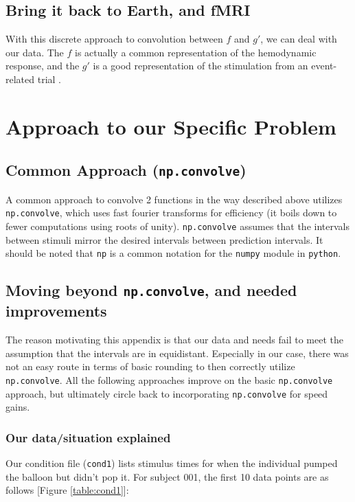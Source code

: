 \documentclass[11pt]{article}
\begin{document}
\subsection{Bring it back to Earth, and fMRI}

With this discrete approach to convolution between $f$ and $g'$, we can deal 
with our data. The $f$ is actually a common representation of the hemodynamic 
response, and the $g'$ is a good representation of the stimulation from an 
event-related trial \cite{brett2015course}. 

\section{Approach to our Specific Problem}

\subsection{Common Approach (\texttt{np.convolve})}

A common approach to convolve 2 functions in the way described above 
utilizes \texttt{np.convolve}, which uses fast fourier transforms for 
efficiency (it boils down to fewer computations using roots of unity). 
\texttt{np.convolve} assumes that the intervals between stimuli mirror the 
desired intervals between prediction intervals. It should be noted that 
\texttt{np} is a common notation for the \texttt{numpy} module in 
\texttt{python}.

\subsection{Moving beyond \texttt{np.convolve}, and needed improvements}

The reason motivating this appendix is that our data and needs fail to meet 
the assumption that the intervals are in equidistant. Especially in our case, 
there was not an easy route in terms of basic rounding to then correctly utilize 
\texttt{np.convolve}. All the following approaches improve on the basic 
\texttt{np.convolve} approach, but ultimately circle back to incorporating 
\texttt{np.convolve} for speed gains. 

\subsubsection{Our data/situation explained}
Our condition file (\texttt{cond1}) lists stimulus times for when the 
individual pumped the balloon but didn't pop it. For subject 001, the 
first 10 data points are as follows [Figure \ref{table:cond1}]:
\end{document}
